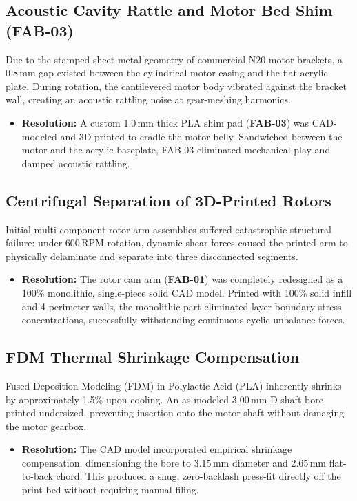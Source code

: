 \subsection{Acoustic Cavity Rattle and Motor Bed Shim (FAB-03)}
Due to the stamped sheet-metal geometry of commercial N20 motor brackets, a 0.8\,mm gap existed between the cylindrical motor casing and the flat acrylic plate. During rotation, the cantilevered motor body vibrated against the bracket wall, creating an acoustic rattling noise at gear-meshing harmonics.
\begin{itemize}
    \item \textbf{Resolution:} A custom 1.0\,mm thick PLA shim pad (\textbf{FAB-03}) was CAD-modeled and 3D-printed to cradle the motor belly. Sandwiched between the motor and the acrylic baseplate, FAB-03 eliminated mechanical play and damped acoustic rattling.
\end{itemize}

\subsection{Centrifugal Separation of 3D-Printed Rotors}
Initial multi-component rotor arm assemblies suffered catastrophic structural failure: under 600\,RPM rotation, dynamic shear forces caused the printed arm to physically delaminate and separate into three disconnected segments.
\begin{itemize}
    \item \textbf{Resolution:} The rotor cam arm (\textbf{FAB-01}) was completely redesigned as a 100\% monolithic, single-piece solid CAD model. Printed with 100\% solid infill and 4 perimeter walls, the monolithic part eliminated layer boundary stress concentrations, successfully withstanding continuous cyclic unbalance forces.
\end{itemize}

\subsection{FDM Thermal Shrinkage Compensation}
Fused Deposition Modeling (FDM) in Polylactic Acid (PLA) inherently shrinks by approximately 1.5\% upon cooling. An as-modeled 3.00\,mm D-shaft bore printed undersized, preventing insertion onto the motor shaft without damaging the motor gearbox.
\begin{itemize}
    \item \textbf{Resolution:} The CAD model incorporated empirical shrinkage compensation, dimensioning the bore to 3.15\,mm diameter and 2.65\,mm flat-to-back chord. This produced a snug, zero-backlash press-fit directly off the print bed without requiring manual filing.
\end{itemize}

